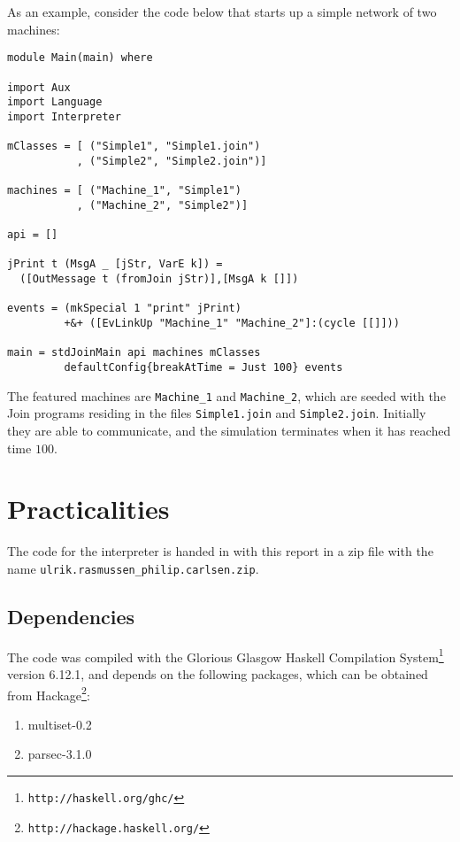 As an example, consider the code below that starts up a simple network of two
machines:
\begin{verbatim}
module Main(main) where

import Aux
import Language
import Interpreter

mClasses = [ ("Simple1", "Simple1.join")
           , ("Simple2", "Simple2.join")]

machines = [ ("Machine_1", "Simple1")
           , ("Machine_2", "Simple2")]

api = []

jPrint t (MsgA _ [jStr, VarE k]) =
  ([OutMessage t (fromJoin jStr)],[MsgA k []])

events = (mkSpecial 1 "print" jPrint)
         +&+ ([EvLinkUp "Machine_1" "Machine_2"]:(cycle [[]]))

main = stdJoinMain api machines mClasses
         defaultConfig{breakAtTime = Just 100} events
\end{verbatim}

The featured machines are \texttt{Machine\_1} and \texttt{Machine\_2}, which are
seeded with the Join programs residing in the files \texttt{Simple1.join} and
\texttt{Simple2.join}. Initially they are able to communicate, and the
simulation terminates when it has reached time $100$.


\section{Practicalities}

The code for the interpreter is handed in with this report in a zip file with
the name \texttt{ulrik.rasmussen\_philip.carlsen.zip}.

\subsection{Dependencies}

The code was compiled with the Glorious Glasgow Haskell Compilation
System\footnote{\texttt{http://haskell.org/ghc/}} version 6.12.1, and depends on
the following packages, which can be obtained from
Hackage\footnote{\texttt{http://hackage.haskell.org/}}:

\begin{enumerate}
 \item multiset-0.2
 \item parsec-3.1.0
\end{enumerate}
